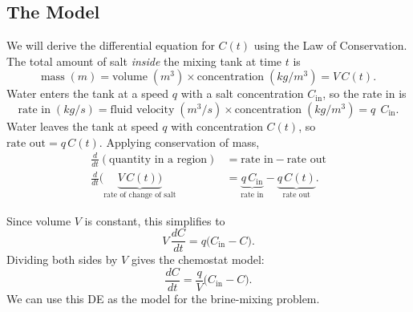 \documentclass[10pt,letterpaper]{article}
\begin{document}
\subsection{The Model}

We will derive the differential equation for $C(t)$ using the Law of Conservation. The total amount of salt \emph{inside} the mixing tank at time $t$ is
\[
\text{mass} \;(m) = \text{volume} \;(m^3) \times \text{concentration} \;(kg/m^3)= V\,C(t).
\]
Water enters the tank at a speed $q$ with a salt concentration $C_{\text{in}}$, so the rate in is
\[
\text{rate in} \;(kg/s) = \text{fluid velocity}\;(m^3/s)\times \text{concentration}\;(kg/m^3)  = q\;\,C_{\text{in}}.
\]
Water leaves the tank at speed $q$ with concentration $C(t)$, so
$\text{rate out} = q\,C(t).$
Applying conservation of mass,
\begin{align*}    
\frac{d}{dt}(\text{quantity in a region}) &= \text{rate in} - \text{rate out}\\
\frac{d}{dt}\bigl(\underbrace{{V\,C(t)}\bigr)}_{\text{rate of change of salt}} &= \underbrace{q\,C_{\text{in}}}_{\text{rate in}} - \underbrace{q\,C(t)}_{\text{rate out}}.
\end{align*}

Since volume $V$ is constant, this simplifies to
\[
V\,\frac{dC}{dt} = q\bigl(C_{\text{in}} - C\bigr).
\]
Dividing both sides by $V$ gives the chemostat model:
\[
\boxed{
\frac{dC}{dt} = \frac{q}{V}\bigl(C_{\text{in}} - C\bigr).
}
\]
We can use this DE as the model for the brine-mixing problem.
\end{document}
